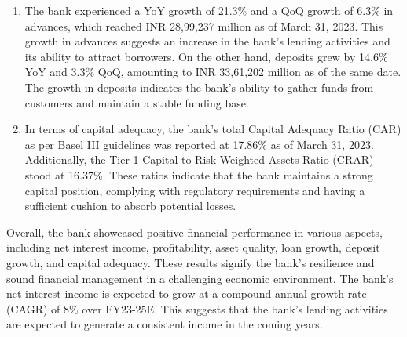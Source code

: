 \begin{enumerate}
\item The bank experienced a YoY growth of 21.3\% and a QoQ growth of 6.3\% in advances, which reached INR 28,99,237 million as of March 31, 2023. This growth in advances suggests an increase in the bank's lending activities and its ability to attract borrowers. On the other hand, deposits grew by 14.6\% YoY and 3.3\% QoQ, amounting to INR 33,61,202 million as of the same date. The growth in deposits indicates the bank's ability to gather funds from customers and maintain a stable funding base.

\item In terms of capital adequacy, the bank's total Capital Adequacy Ratio (CAR) as per Basel III guidelines was reported at 17.86\% as of March 31, 2023. Additionally, the Tier 1 Capital to Risk-Weighted Assets Ratio (CRAR) stood at 16.37\%. These ratios indicate that the bank maintains a strong capital position, complying with regulatory requirements and having a sufficient cushion to absorb potential losses.


\end{enumerate}
 Overall, the bank showcased positive financial performance in various aspects, including net interest income, profitability, asset quality, loan growth, deposit growth, and capital adequacy. These results signify the bank's resilience and sound financial management in a challenging economic environment. The bank's net interest income is expected to grow at a compound annual growth rate (CAGR) of 8\% over FY23-25E. This suggests that the bank's lending activities are expected to generate a consistent income in the coming years.

